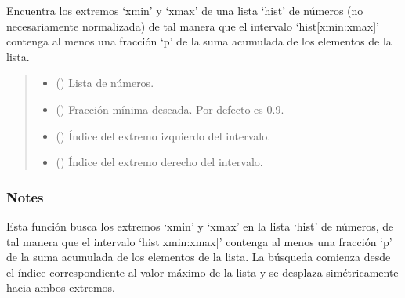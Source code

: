 \documentclass[letterpaper,10pt,english]{sphinxmanual}
\begin{document}
\begin{fulllineitems}
\label{\detokenize{myutils:myutils.stats.get_area_fraction}}
\pysigstartsignatures
{}
\pysigstopsignatures
\sphinxAtStartPar
Encuentra los extremos ‘xmin’ y ‘xmax’ de una lista ‘hist’ de números (no necesariamente normalizada)
de tal manera que el intervalo ‘hist{[}xmin:xmax{]}’ contenga al menos una fracción ‘p’ de la suma acumulada
de los elementos de la lista.
\begin{quote}\begin{description}
\begin{itemize}
\item {} 
\sphinxAtStartPar
{} () \textendash{} Lista de números.

\item {} 
\sphinxAtStartPar
{} (\sphinxstyleliteralemphasis{\sphinxupquote{, }}) \textendash{} Fracción mínima deseada. Por defecto es 0.9.

\end{itemize}

\sphinxAtStartPar
\begin{itemize}
\item {} 
\sphinxAtStartPar
{} () \textendash{} Índice del extremo izquierdo del intervalo.

\item {} 
\sphinxAtStartPar
{} () \textendash{} Índice del extremo derecho del intervalo.

\end{itemize}


\end{description}\end{quote}
\subsubsection*{Notes}

\sphinxAtStartPar
Esta función busca los extremos ‘xmin’ y ‘xmax’ en la lista ‘hist’ de números, de tal manera que el intervalo
‘hist{[}xmin:xmax{]}’ contenga al menos una fracción ‘p’ de la suma acumulada de los elementos de la lista. La búsqueda
comienza desde el índice correspondiente al valor máximo de la lista y se desplaza simétricamente hacia ambos extremos.

\end{fulllineitems}
\end{document}
